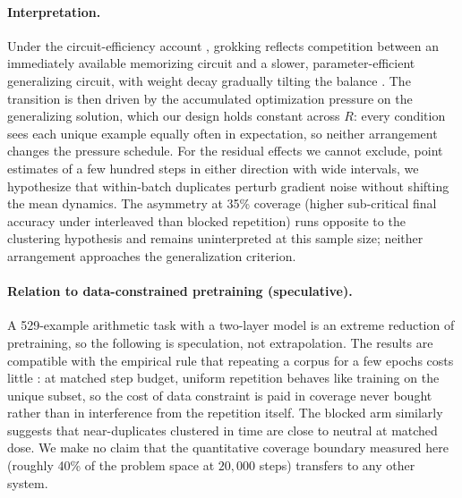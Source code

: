 \documentclass[10pt]{article}
\begin{document}
\paragraph{Interpretation.}
Under the circuit-efficiency account \citep{varma2024explaining}, grokking reflects competition between an immediately available memorizing circuit and a slower, parameter-efficient generalizing circuit, with weight decay gradually tilting the balance \citep{liu2023omnigrok}. The transition is then driven by the accumulated optimization pressure on the generalizing solution, which our design holds constant across $R$: every condition sees each unique example equally often in expectation, so neither arrangement changes the pressure schedule. For the residual effects we cannot exclude, point estimates of a few hundred steps in either direction with wide intervals, we hypothesize that within-batch duplicates perturb gradient noise without shifting the mean dynamics. The asymmetry at 35\% coverage (higher sub-critical final accuracy under interleaved than blocked repetition) runs opposite to the clustering hypothesis and remains uninterpreted at this sample size; neither arrangement approaches the generalization criterion.

\paragraph{Relation to data-constrained pretraining (speculative).}
A 529-example arithmetic task with a two-layer model is an extreme reduction of pretraining, so the following is speculation, not extrapolation. The results are compatible with the empirical rule that repeating a corpus for a few epochs costs little \citep{muennighoff2023scaling}: at matched step budget, uniform repetition behaves like training on the unique subset, so the cost of data constraint is paid in coverage never bought rather than in interference from the repetition itself. The blocked arm similarly suggests that near-duplicates clustered in time are close to neutral at matched dose. We make no claim that the quantitative coverage boundary measured here (roughly 40\% of the problem space at $20{,}000$ steps) transfers to any other system.
\end{document}
